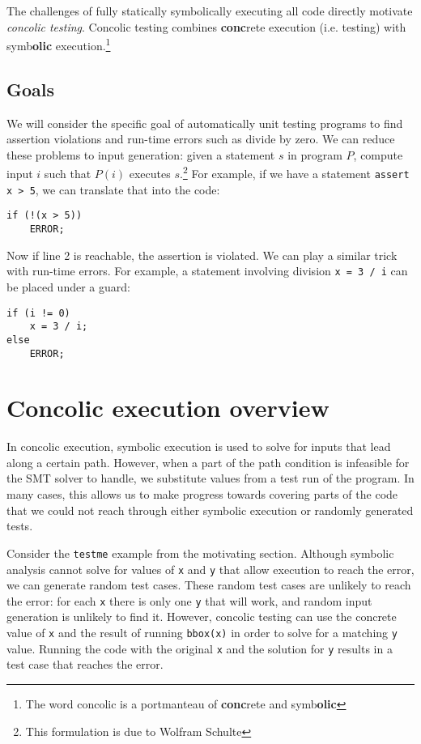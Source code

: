 \documentclass[11pt]{article}
\begin{document}
The challenges of fully statically symbolically executing all code directly
motivate \emph{concolic testing}. Concolic testing combines \textbf{conc}rete
execution (i.e. testing) with symb\textbf{olic} execution.\footnote{The word
  concolic is a portmanteau of \textbf{conc}rete and symb\textbf{olic}}

\subsection{Goals}

We will consider the specific goal of automatically unit testing programs to
find assertion violations and run-time errors such as divide by zero. We can
reduce these problems to input generation: given a statement $s$ in program $P$,
compute input $i$ such that $P(i)$ executes $s$.\footnote{This formulation is
  due to Wolfram Schulte} For example, if we have a statement \texttt{assert x >
  5}, we can translate that into the code:

\lstset{
         numbers=left
}

\begin{lstlisting}
if (!(x > 5))
    ERROR;
\end{lstlisting}

Now if line 2 is reachable, the assertion is violated. We can play a similar
trick with run-time errors. For example, a statement involving division
\texttt{x = 3 / i} can be placed under a guard:

\begin{lstlisting}
if (i != 0)
    x = 3 / i;
else
    ERROR;
\end{lstlisting}



\section{Concolic execution overview}

In concolic execution, symbolic execution is used to solve for inputs that lead
along a certain path. However, when a part of the path condition is infeasible
for the SMT solver to handle, we substitute values from a test run of the
program. In many cases, this allows us to make progress towards covering parts
of the code that we could not reach through either symbolic execution or
randomly generated tests. 

Consider the \texttt{testme} example from the motivating section. Although
symbolic analysis cannot solve for values of \texttt{x} and \texttt{y} that
allow execution to reach the error, we can generate random test cases. These
random test cases are unlikely to reach the error: for each \texttt{x} there is
only one \texttt{y} that will work, and random input generation is unlikely to
find it. However, concolic testing can use the concrete value of \texttt{x} and
the result of running \texttt{bbox(x)} in order to solve for a matching
\texttt{y} value. Running the code with the original \texttt{x} and the solution
for \texttt{y} results in a test case that reaches the error.
\end{document}
